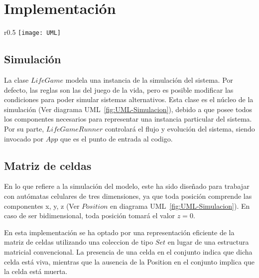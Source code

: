 \section{Implementación}\label{sec:implementacion}

\begin{wrapfigure}{r}{0.5\textwidth}
    \centering
    \texttt{[image: UML]}
    \caption{Diagrama UML}
    \label{fig:UML-Simulacion}
\end{wrapfigure}

\subsection{Simulación}\label{label:simulacion}
    La clase $LifeGame$ modela una instancia de la simulación del sistema. Por defecto, las reglas son las del juego de la vida,
    pero es posible modificar las condiciones para poder simular sistemas alternativos. Esta clase es el núcleo de la
    simulación (Ver diagrama UML~\ref{fig:UML-Simulacion}), debido a que posee todos los componentes necesarios
    para representar una instancia particular del sistema. Por su parte, $LifeGameRunner$ controlará el flujo y evolución del sistema,
    siendo invocado por $App$ que es el punto de entrada al codigo.

\subsection{Matriz de celdas}\label{subsec:matriz de celdas}
    En lo que refiere a la simulación del modelo, este ha sido diseñado para trabajar con autómatas celulares de tres
    dimensiones, ya que toda posición comprende las componentes x, y, z (Ver $Position$ en diagrama UML~\ref{fig:UML-Simulacion}).
    En caso de ser bidimensional, toda posición tomará el valor $z = 0$.

    En esta implementación se ha optado por una representación eficiente de la matriz de celdas utilizando una coleccion de
    tipo $Set$ en lugar de una estructura matricial convencional.
    La presencia de una celda en el conjunto indica que dicha celda está viva, mientras que la ausencia de la Position en
    el conjunto implica que la celda está muerta.

